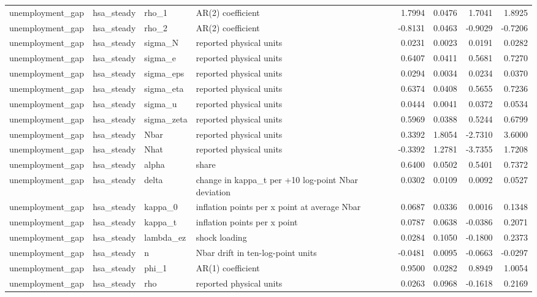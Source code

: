\begin{tabular}{llllrrrr}
unemployment\_gap & hsa\_steady & rho\_1 & AR(2) coefficient & 1.7994 & 0.0476 & 1.7041 & 1.8925 \\
unemployment\_gap & hsa\_steady & rho\_2 & AR(2) coefficient & -0.8131 & 0.0463 & -0.9029 & -0.7206 \\
unemployment\_gap & hsa\_steady & sigma\_N & reported physical units & 0.0231 & 0.0023 & 0.0191 & 0.0282 \\
unemployment\_gap & hsa\_steady & sigma\_e & reported physical units & 0.6407 & 0.0411 & 0.5681 & 0.7270 \\
unemployment\_gap & hsa\_steady & sigma\_eps & reported physical units & 0.0294 & 0.0034 & 0.0234 & 0.0370 \\
unemployment\_gap & hsa\_steady & sigma\_eta & reported physical units & 0.6374 & 0.0408 & 0.5655 & 0.7236 \\
unemployment\_gap & hsa\_steady & sigma\_u & reported physical units & 0.0444 & 0.0041 & 0.0372 & 0.0534 \\
unemployment\_gap & hsa\_steady & sigma\_zeta & reported physical units & 0.5969 & 0.0388 & 0.5244 & 0.6799 \\
unemployment\_gap & hsa\_steady & Nbar & reported physical units & 0.3392 & 1.8054 & -2.7310 & 3.6000 \\
unemployment\_gap & hsa\_steady & Nhat & reported physical units & -0.3392 & 1.2781 & -3.7355 & 1.7208 \\
unemployment\_gap & hsa\_steady & alpha & share & 0.6400 & 0.0502 & 0.5401 & 0.7372 \\
unemployment\_gap & hsa\_steady & delta & change in kappa\_t per +10 log-point Nbar deviation & 0.0302 & 0.0109 & 0.0092 & 0.0527 \\
unemployment\_gap & hsa\_steady & kappa\_0 & inflation points per x point at average Nbar & 0.0687 & 0.0336 & 0.0016 & 0.1348 \\
unemployment\_gap & hsa\_steady & kappa\_t & inflation points per x point & 0.0787 & 0.0638 & -0.0386 & 0.2071 \\
unemployment\_gap & hsa\_steady & lambda\_ez & shock loading & 0.0284 & 0.1050 & -0.1800 & 0.2373 \\
unemployment\_gap & hsa\_steady & n & Nbar drift in ten-log-point units & -0.0481 & 0.0095 & -0.0663 & -0.0297 \\
unemployment\_gap & hsa\_steady & phi\_1 & AR(1) coefficient & 0.9500 & 0.0282 & 0.8949 & 1.0054 \\
unemployment\_gap & hsa\_steady & rho & reported physical units & 0.0263 & 0.0968 & -0.1618 & 0.2169 \\

\end{tabular}
